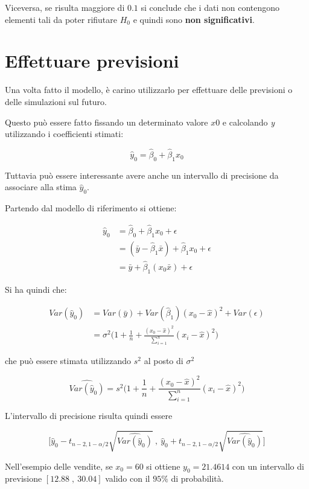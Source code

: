Viceversa, se risulta maggiore di $ 0.1 $ si conclude che i dati non contengono elementi tali da poter rifiutare $ H_0 $ e quindi sono \textbf{non significativi}.

\section{Effettuare previsioni}\label{effettuare-previsioni}

Una volta fatto il modello, è carino utilizzarlo per effettuare delle
previsioni o delle simulazioni sul futuro.

Questo può essere fatto fissando un determinato valore $ x0 $ e calcolando \textit{y} utilizzando i coefficienti stimati:

$$
\hat{y}_0 = \hat{\beta}_0 + \hat{\beta}_1 x_0
$$

Tuttavia può essere interessante avere anche un intervallo di precisione da associare alla stima $ \hat{y}_0 $.

Partendo dal modello di riferimento si ottiene:

\begin{align*}
	\hat{y}_0 &= \hat{\beta}_0 + \hat{\beta}_1 x_0 + \epsilon \\
					&= (\bar{y} - \hat{\beta}_1 \bar{x}) + \hat{\beta}_1 x_0 + \epsilon \\
					&= \bar{y} + \hat{\beta}_1(x_0 \bar{x}) + \epsilon 
\end{align*}

Si ha quindi che:

\begin{align*}
	Var(\hat{y}_0) &= Var(\bar{y}) + Var(\hat{\beta}_1)(x_0 - \hat{x})^2 + Var(\epsilon) \\
	                         &= \sigma^2 \Bigg( 1 + \frac{1}{n} + \frac{(x_0 - \hat{x})^2}{\sum_{i=1}^{n}} (x_i - \hat{x})^2 \Bigg)
\end{align*}

che può essere stimata utilizzando $ s^2 $ al posto di $ \sigma^2 $

$$
\widehat{Var(\hat{y}_0)} = s^2 \Bigg( 1 + \frac{1}{n} + \frac{(x_0 - \hat{x})^2}{\sum_{i=1}^{n}} (x_i - \hat{x})^2 \Bigg)
$$

L'intervallo di precisione risulta quindi essere

$$
\Bigg[ \hat{y}_0 - t_{n-2, 1-\alpha/2}\sqrt{\widehat{Var(\hat{y}_0)}} \:, \:\hat{y}_0 + t_{n-2, 1-\alpha/2}\sqrt{\widehat{Var(\hat{y}_0)}}\Bigg]
$$

Nell'esempio delle vendite, se $ x_0 = 60 $ si ottiene $ y_0 = 21.4614 $ con un intervallo di previsione $ [12.88 \; , \: 30.04] $ valido con il $ 95\% $ di probabilità.


